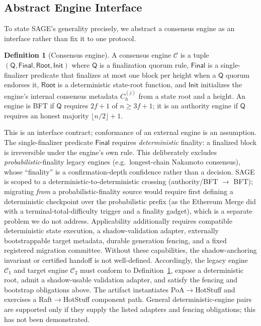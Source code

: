 \documentclass[journal]{IEEEtran}
\theoremstyle{definition}
\newtheorem{definition}{Definition}
\theoremstyle{remark}
\begin{document}
\subsection{Abstract Engine Interface}
To state SAGE's generality precisely, we abstract a consensus engine as an interface rather
than fix it to one protocol.
\begin{definition}[Consensus engine]
\label{def:engine}
A consensus engine $\mathcal{C}$ is a tuple $(\mathsf{Q}, \mathsf{Final}, \mathsf{Root},
\mathsf{Init})$ where $\mathsf{Q}$ is a finalization quorum rule, $\mathsf{Final}$ is a
single-finalizer predicate that finalizes at most one block per height when a $\mathsf{Q}$
quorum endorses it, $\mathsf{Root}$ is a deterministic state-root function, and
$\mathsf{Init}$ initializes the engine's internal consensus metadata $C_h^{(j)}$ from a state root
and a height. An engine is BFT if $\mathsf{Q}$ requires $2f+1$ of $n \ge 3f+1$; it is an
authority engine if $\mathsf{Q}$ requires an honest majority $\lfloor n/2\rfloor+1$.
\end{definition}
This is an interface contract; conformance of an external engine is an assumption.
The single-finalizer predicate $\mathsf{Final}$ requires \emph{deterministic} finality: a
finalized block is irreversible under the engine's own rule. This deliberately excludes
\emph{probabilistic}-finality legacy engines (e.g.\ longest-chain Nakamoto consensus), whose
``finality'' is a confirmation-depth confidence rather than a decision. SAGE is scoped to a
deterministic-to-deterministic crossing (authority/BFT $\rightarrow$ BFT); migrating
\emph{from} a probabilistic-finality source would require first defining a deterministic
checkpoint over the probabilistic prefix (as the Ethereum Merge did with a
terminal-total-difficulty trigger and a finality gadget), which is a separate problem we do
not address. Applicability additionally requires compatible deterministic state execution, a
shadow-validation adapter, externally bootstrappable target metadata, durable generation fencing,
and a fixed registered migration committee. Without these capabilities, the shadow-anchoring
invariant or certified handoff is not well-defined.
Accordingly, the legacy engine $\mathcal{C}_1$ and target engine $\mathcal{C}_2$ must conform to
Definition~\ref{def:engine}, expose a deterministic root, admit a shadow-usable validation adapter,
and satisfy the fencing and bootstrap obligations above. The artifact instantiates
PoA$\rightarrow$HotStuff and exercises a Raft$\rightarrow$HotStuff component path. General
deterministic-engine pairs are supported only if they supply the listed adapters and fencing
obligations; this has not been demonstrated.
\end{document}
